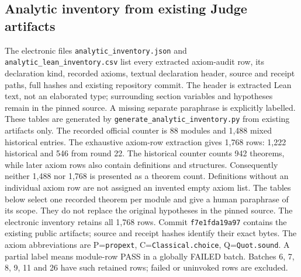 \subsection{Analytic inventory from existing Judge artifacts}
\label{app:analytic-inventory}
The electronic files \texttt{analytic\_inventory.json} and \texttt{analytic\_lean\_inventory.csv} list every extracted axiom-audit row, its declaration kind, recorded axioms, textual declaration header, source and receipt paths, full hashes and existing repository commit. The header is extracted Lean text, not an elaborated type; surrounding section variables and hypotheses remain in the pinned source. A missing separate paraphrase is explicitly labelled. These tables are generated by \texttt{generate\_analytic\_inventory.py} from existing artifacts only.
The recorded official counter is 88 modules and 1,488 mixed historical entries. The exhaustive axiom-row extraction gives 1,768 rows: 1,222 historical and 546 from round 22. The historical counter counts 942 theorems, while later axiom rows also contain definitions and structures. Consequently neither 1,488 nor 1,768 is presented as a theorem count. Definitions without an individual axiom row are not assigned an invented empty axiom list.
The tables below select one recorded theorem per module and give a human paraphrase of its scope. They do not replace the original hypotheses in the pinned source. The electronic inventory retains all 1,768 rows. Commit \texttt{f7e1fda19a97} contains the existing public artifacts; source and receipt hashes identify their exact bytes. The axiom abbreviations are P=\texttt{propext}, C=\texttt{Classical.choice}, Q=\texttt{Quot.sound}. A partial label means module-row PASS in a globally FAILED batch. Batches 6, 7, 8, 9, 11 and 26 have such retained rows; failed or uninvoked rows are excluded.
